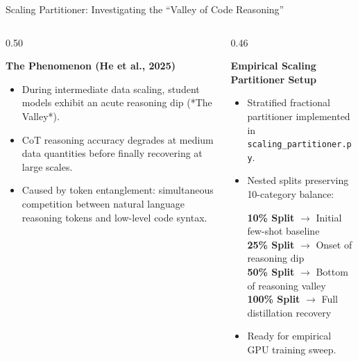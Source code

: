 \documentclass[aspectratio=169,10pt]{beamer}
\begin{document}
\begin{frame}{Scaling Partitioner: Investigating the ``Valley of Code Reasoning''}
  \begin{columns}[T]
    \begin{column}{0.50\textwidth}
      \begin{block}{\textbf{The Phenomenon (He et al., 2025)}}
        \begin{itemize}\itemsep=3pt\footnotesize
          \item During intermediate data scaling, student models exhibit an acute reasoning dip (*The Valley*).
          \item CoT reasoning accuracy degrades at medium data quantities before finally recovering at large scales.
          \item Caused by token entanglement: simultaneous competition between natural language reasoning tokens and low-level code syntax.
        \end{itemize}
      \end{block}
    \end{column}

    \begin{column}{0.46\textwidth}
      \begin{exampleblock}{\textbf{Empirical Scaling Partitioner Setup}}
        \begin{itemize}\itemsep=3pt\footnotesize
          \item Stratified fractional partitioner implemented in \texttt{scaling\_partitioner.py}.
          \item Nested splits preserving 10-category balance:
            \begin{center}
              \textbf{10\% Split} $\to$ Initial few-shot baseline \\
              \textbf{25\% Split} $\to$ Onset of reasoning dip \\
              \textbf{50\% Split} $\to$ Bottom of reasoning valley \\
              \textbf{100\% Split} $\to$ Full distillation recovery
            \end{center}
          \item Ready for empirical GPU training sweep.
        \end{itemize}
      \end{exampleblock}
    \end{column}
  \end{columns}
\end{frame}
\end{document}

